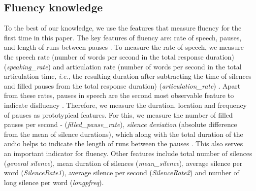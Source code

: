 \documentclass[sigconf]{acmart}
\begin{document}
\subsection{Fluency knowledge}
\label{subsec:Fluency Features}
To the best of our knowledge, we use the features that measure fluency for the first time in this paper. 
The key features of fluency are: rate of speech, pauses, and length of runs between pauses \cite{yan2018complexity}. To measure the rate of speech, we measure the speech rate (number of words per second in the total response duration) (\emph{speaking\_rate}) and articulation rate (number of words per second in the total articulation time, \emph{i.e.,} the resulting duration after subtracting the time of silences and filled pauses from the total response duration) (\emph{articulation\_rate}) \cite{wood2001search}. Apart from these rates, pauses in speech are the second most observable feature to indicate disfluency \cite{igras2016structure}. Therefore, we measure the duration, location and frequency of pauses as prototypical features. For this, we measure the number of filled pauses per second - (\emph{filled\_pause\_rate}), \emph{silence deviation} (absolute difference from the mean of silence durations), which along with the total duration of the audio helps to indicate the length of runs between the pauses \cite{mohle1984comparison}. This also serves an important indicator for fluency. Other features include total number of silences (\emph{general silence}), mean duration of silences (\emph{mean\_silence}), average silence per word (\emph{SilenceRate1}), average silence per second (\emph{SilenceRate2}) and number of long silence per word (\emph{longpfreq}).
\end{document}
